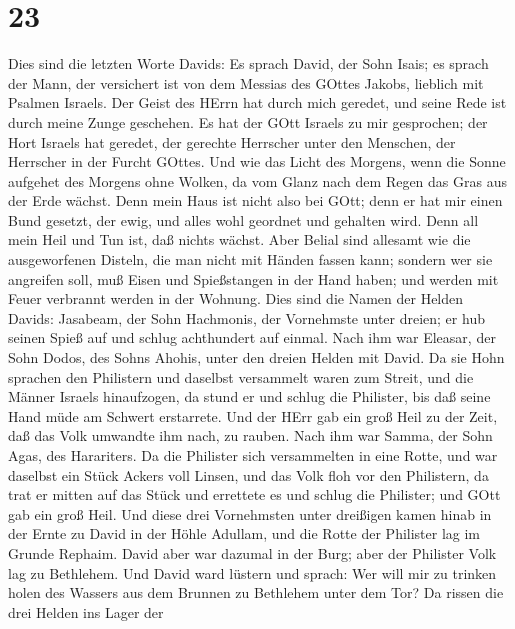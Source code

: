 \hypertarget{section-22}{%
\section{23}\label{section-22}}

 Dies sind die letzten Worte Davids: Es sprach David, der
Sohn Isais; es sprach der Mann, der versichert ist von dem Messias des
GOttes Jakobs, lieblich mit Psalmen Israels.  Der Geist des
HErrn hat durch mich geredet, und seine Rede ist durch meine Zunge
geschehen.  Es hat der GOtt Israels zu mir gesprochen; der
Hort Israels hat geredet, der gerechte Herrscher unter den Menschen, der
Herrscher in der Furcht GOttes.  Und wie das Licht des
Morgens, wenn die Sonne aufgehet des Morgens ohne Wolken, da vom Glanz
nach dem Regen das Gras aus der Erde wächst.  Denn mein Haus
ist nicht also bei GOtt; denn er hat mir einen Bund gesetzt, der ewig,
und alles wohl geordnet und gehalten wird. Denn all mein Heil und Tun
ist, daß nichts wächst.  Aber Belial sind allesamt wie die
ausgeworfenen Disteln, die man nicht mit Händen fassen kann;
 sondern wer sie angreifen soll, muß Eisen und Spießstangen
in der Hand haben; und werden mit Feuer verbrannt werden in der Wohnung.
 Dies sind die Namen der Helden Davids: Jasabeam, der Sohn
Hachmonis, der Vornehmste unter dreien; er hub seinen Spieß auf und
schlug achthundert auf einmal.  Nach ihm war Eleasar, der
Sohn Dodos, des Sohns Ahohis, unter den dreien Helden mit David. Da sie
Hohn sprachen den Philistern und daselbst versammelt waren zum Streit,
und die Männer Israels hinaufzogen,  da stund er und schlug
die Philister, bis daß seine Hand müde am Schwert erstarrete. Und der
HErr gab ein groß Heil zu der Zeit, daß das Volk umwandte ihm nach, zu
rauben.  Nach ihm war Samma, der Sohn Agas, des Harariters.
Da die Philister sich versammelten in eine Rotte, und war daselbst ein
Stück Ackers voll Linsen, und das Volk floh vor den Philistern,
 da trat er mitten auf das Stück und errettete es und
schlug die Philister; und GOtt gab ein groß Heil.  Und
diese drei Vornehmsten unter dreißigen kamen hinab in der Ernte zu David
in der Höhle Adullam, und die Rotte der Philister lag im Grunde Rephaim.
 David aber war dazumal in der Burg; aber der Philister
Volk lag zu Bethlehem.  Und David ward lüstern und sprach:
Wer will mir zu trinken holen des Wassers aus dem Brunnen zu Bethlehem
unter dem Tor?  Da rissen die drei Helden ins Lager der

